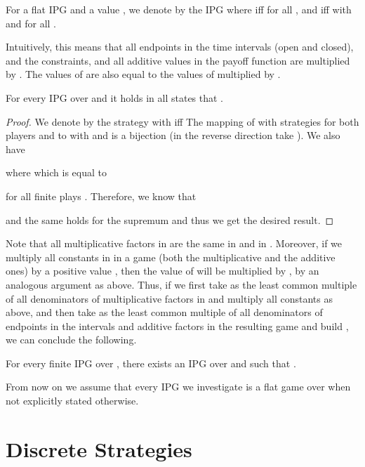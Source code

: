 \documentclass[fleqn,envcountsame]{LMCS}
\begin{document}
\begin{defi}
For a flat IPG  and
a value , we denote by
 the IPG where 
 iff  
for all , and   iff
 with  and
 for all .
\end{defi}

Intuitively, this means that all endpoints in the time intervals (open and closed),
and the constraints, and all additive values in the payoff function 
are multiplied by . The values of  are also equal to
the values of  multiplied by .

\begin{lem} \label{mult_games}
For every IPG  over  and  it holds in all states
 that .
\end{lem}

\begin{proof}
We denote by  the strategy with 
 iff 
The mapping of  with strategies for both players  and 
to  with  and  is a bijection 
(in the reverse direction take ). We also have 

where  which is equal to 

for all finite plays . Therefore, we know that 
 
and the same holds for the supremum and thus we get the desired result.
\end{proof}

Note that all multiplicative factors in  are the same in  and
in . Moreover, if we multiply all constants in  in a game
 (both the multiplicative and the additive ones) by a positive value ,
then the value of  will be multiplied by , by an analogous argument as
above. Thus, if we first take  as the least common multiple of all denominators
of multiplicative factors in  and multiply all  constants as above,
and then take  as the least common multiple of all denominators of endpoints
in  the intervals and additive factors in the resulting game  and build
, we can conclude the following.

\begin{cor} \label{mult_games_col}
For every finite IPG  over , there exists an IPG  over  and
 such that .
\end{cor}

From now on we assume that every IPG we investigate is a flat game over 
when not explicitly stated otherwise. 


\section{Discrete Strategies} \label{sec_ds}
\end{document}
